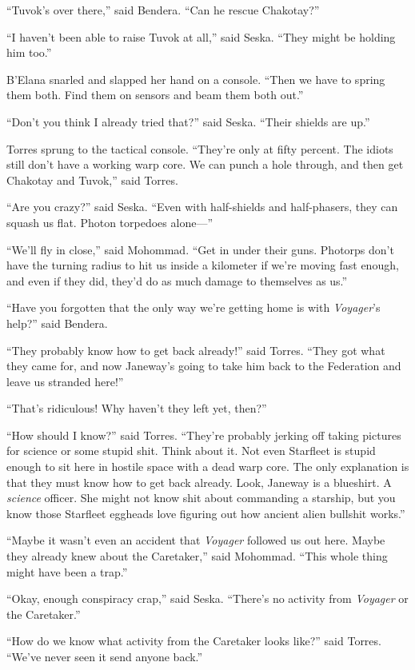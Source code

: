 \documentclass[twoside,letterpaper,12pt]{memoir}
\begin{document}
``Tuvok's over there,'' said Bendera. ``Can he rescue Chakotay?''

``I haven't been able to raise Tuvok at all,'' said Seska. ``They might be holding him too.''

B'Elana snarled and slapped her hand on a console. ``Then we have to spring them both. Find them on sensors and beam them both out.''

``Don't you think I already tried that?'' said Seska. ``Their shields are up.''

Torres sprung to the tactical console. ``They're only at fifty percent. The idiots still don't have a working warp core. We can punch a hole through, and then get Chakotay and Tuvok,'' said Torres.

``Are you crazy?'' said Seska. ``Even with half-shields and half-phasers, they can squash us flat. Photon torpedoes alone---''

``We'll fly in close,'' said Mohommad. ``Get in under their guns. Photorps don't have the turning radius to hit us inside a kilometer if we're moving fast enough, and even if they did, they'd do as much damage to themselves as us.''

``Have you forgotten that the only way we're getting home is with \textit{Voyager}'s help?'' said Bendera.

``They probably know how to get back already!'' said Torres. ``They got what they came for, and now Janeway's going to take him back to the Federation and leave us stranded here!''

``That's ridiculous! Why haven't they left yet, then?''

``How should I know?'' said Torres. ``They're probably jerking off taking pictures for science or some stupid shit. Think about it. Not even Starfleet is stupid enough to sit here in hostile space with a dead warp core. The only explanation is that they must know how to get back already. Look, Janeway is a blueshirt. A \textit{science} officer. She might not know shit about commanding a starship, but you know those Starfleet eggheads love figuring out how ancient alien bullshit works.''

``Maybe it wasn't even an accident that \textit{Voyager} followed us out here. Maybe they already knew about the Caretaker,'' said Mohommad. ``This whole thing might have been a trap.''

``Okay, enough conspiracy crap,'' said Seska. ``There's no activity from \textit{Voyager} or the Caretaker.''

``How do we know what activity from the Caretaker looks like?'' said Torres. ``We've never seen it send anyone back.''
\end{document}
